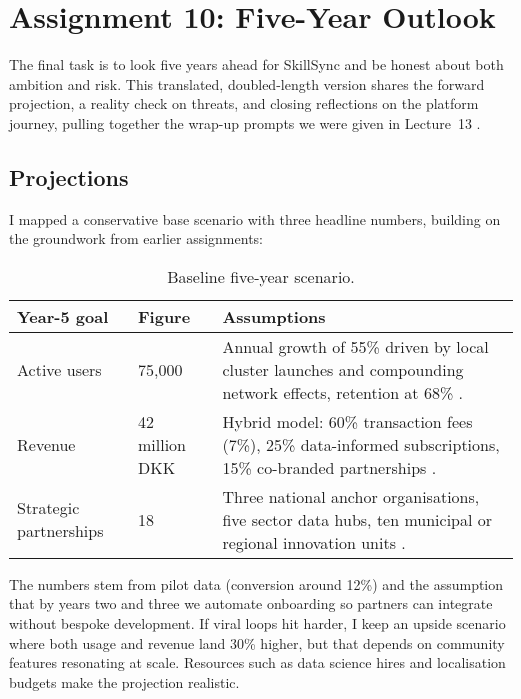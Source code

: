 \section*{Assignment 10: Five-Year Outlook}

The final task is to look five years ahead for SkillSync and be honest about both ambition and risk. This translated, doubled-length version shares the forward projection, a reality check on threats, and closing reflections on the platform journey, pulling together the wrap-up prompts we were given in Lecture~13 \citep{Lecture13}.

\subsection*{Projections}
I mapped a conservative base scenario with three headline numbers, building on the groundwork from earlier assignments:\newline
\begin{table}[H]
  \centering
  \begin{tabular}{p{3cm}p{3.5cm}p{6cm}}
    \toprule
    \textbf{Year-5 goal} & \textbf{Figure} & \textbf{Assumptions} \\
    \midrule
    Active users & 75,000 & Annual growth of 55\% driven by local cluster launches and compounding network effects, retention at 68\% \citep{Choudary2016,Srnicek2017}. \\
    Revenue & 42 million DKK & Hybrid model: 60\% transaction fees (7\%), 25\% data-informed subscriptions, 15\% co-branded partnerships \citep{ShapiroVarian1999}. \\
    Strategic partnerships & 18 & Three national anchor organisations, five sector data hubs, ten municipal or regional innovation units \citep{Reillier2017}. \\
    \bottomrule
  \end{tabular}
  \caption{Baseline five-year scenario.}
\end{table}

The numbers stem from pilot data (conversion around 12\%) and the assumption that by years two and three we automate onboarding so partners can integrate without bespoke development. If viral loops hit harder, I keep an upside scenario where both usage and revenue land 30\% higher, but that depends on community features resonating at scale. Resources such as data science hires and localisation budgets make the projection realistic.

